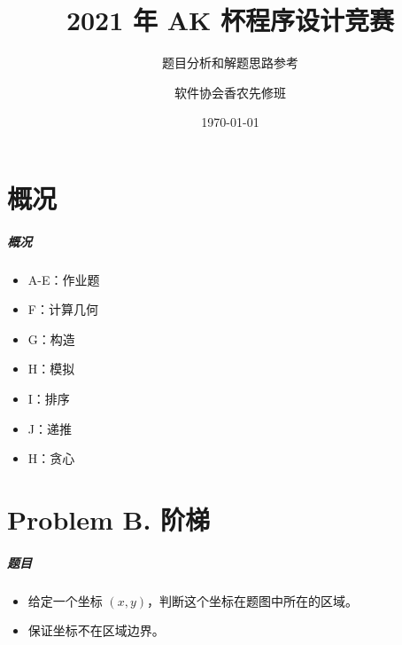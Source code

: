 \documentclass[
     aspectratio=169,                   %
]{beamer}
\begin{document}
    \title{2021 年 AK 杯程序设计竞赛}  %
    \subtitle{题目分析和解题思路参考}         %
    \author{软件协会香农先修班}                  %
    \date{\today}                          %
    \maketitle                             %

    
\part{概况}

\begin{frame}
	\frametitle{概况}
	\begin{itemize}
		\item A-E：作业题
		\item F：计算几何
		\item G：构造
		\item H：模拟
		\item I：排序
		\item J：递推
		\item H：贪心
	\end{itemize}
\end{frame}


\part{Problem B. 阶梯}
\begin{frame}
	\frametitle{题目}
	\begin{itemize}
		\item 给定一个坐标 $(x,y)$，判断这个坐标在题图中所在的区域。
		\item 保证坐标不在区域边界。
	\end{itemize}
\end{frame}
\end{document}
